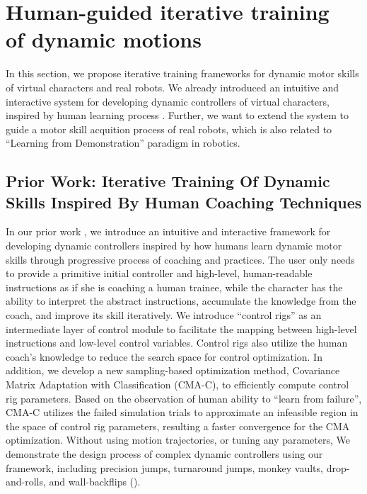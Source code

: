 \chapter{Human-guided iterative training \protect\\ of dynamic motions}
In this section, we propose iterative training frameworks for
dynamic motor skills of virtual characters and real robots.
We already introduced an intuitive and interactive system for
developing dynamic controllers of virtual characters,
inspired by human learning process \cite{fitts:1967:hp}.
Further, we want to extend the system to guide a motor skill 
acquition process of real robots, which is also related to
``Learning from Demonstration'' paradigm in robotics.

\section{Prior Work: Iterative Training Of Dynamic Skills Inspired By Human Coaching Techniques}

In our prior work \cite{Ha:2014:ITD},
we introduce an intuitive and interactive framework for developing 
dynamic controllers inspired by how humans learn dynamic motor
skills through progressive process of coaching and practices. 
The user only needs to provide a primitive initial controller and
high-level, human-readable instructions as if
she is coaching a human trainee, while the character has the ability
to interpret the abstract instructions, accumulate the knowledge from
the coach, and improve its skill iteratively. We introduce ``control
rigs'' as an intermediate layer of control module to facilitate the
mapping between high-level instructions and low-level control
variables. Control rigs also utilize the human coach's knowledge to
reduce the search space for control optimization. In addition, we
develop a new sampling-based optimization method, Covariance Matrix
Adaptation with Classification (CMA-C), to efficiently compute control
rig parameters. Based on the observation of human ability to ``learn
from failure'', CMA-C utilizes the failed simulation trials to
approximate an infeasible region in the space of control rig
parameters, resulting a faster convergence for the CMA
optimization. 
Without using motion trajectories, or tuning any parameters,
We demonstrate the design process of complex dynamic
controllers using our framework, including precision jumps, turnaround
jumps, monkey vaults, drop-and-rolls, and wall-backflips 
().


